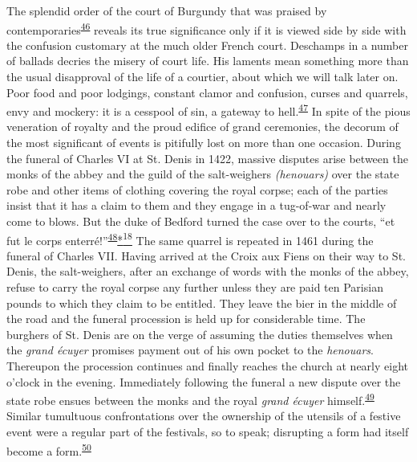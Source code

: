 The splendid order of the court of Burgundy that was praised
\protect\hypertarget{09_Chapter_Two__THE_CRAVING_FOR_A_M.xhtmlux5cux23page_51}{}{}by
contemporaries\textsuperscript{\protect\hypertarget{09_Chapter_Two__THE_CRAVING_FOR_A_M.xhtmlux5cux23id_1996}{\protect\hyperlink{23_NOTES.xhtmlux5cux23id_1997}{46}}}
reveals its true significance only if it is viewed side by side with the
confusion customary at the much older French court. Deschamps in a
number of ballads decries the misery of court life. His laments mean
something more than the usual disapproval of the life of a courtier,
about which we will talk later on. Poor food and poor lodgings, constant
clamor and confusion, curses and quarrels, envy and mockery: it is a
cesspool of sin, a gateway to
hell.\textsuperscript{\protect\hypertarget{09_Chapter_Two__THE_CRAVING_FOR_A_M.xhtmlux5cux23id_1994}{\protect\hyperlink{23_NOTES.xhtmlux5cux23id_1995}{47}}}
In spite of the pious veneration of royalty and the proud edifice of
grand ceremonies, the decorum of the most significant of events is
pitifully lost on more than one occasion. During the funeral of Charles
VI at St. Denis in 1422, massive disputes arise between the monks of the
abbey and the guild of the salt-weighers \emph{(henouars)} over the
state robe and other items of clothing covering the royal corpse; each
of the parties insist that it has a claim to them and they engage in a
tug-of-war and nearly come to blows. But the duke of Bedford turned the
case over to the courts, ``et fut le corps
enterré!''\textsuperscript{\protect\hypertarget{09_Chapter_Two__THE_CRAVING_FOR_A_M.xhtmlux5cux23id_1992}{\protect\hyperlink{23_NOTES.xhtmlux5cux23id_1993}{48}}}\protect\hypertarget{09_Chapter_Two__THE_CRAVING_FOR_A_M.xhtmlux5cux23id_2443}{\protect\hyperlink{23_NOTES.xhtmlux5cux23id_2444}{*\textsuperscript{18}}}
The same quarrel is repeated in 1461 during the funeral of Charles VII.
Having arrived at the Croix aux Fiens on their way to St. Denis, the
salt-weighers, after an exchange of words with the monks of the abbey,
refuse to carry the royal corpse any further unless they are paid ten
Parisian pounds to which they claim to be entitled. They leave the bier
in the middle of the road and the funeral procession is held up for
considerable time. The burghers of St. Denis are on the verge of
assuming the duties themselves when the \emph{grand écuyer} promises
payment out of his own pocket to the \emph{henouars}. Thereupon the
procession continues and finally reaches the church at nearly eight
o'clock in the evening. Immediately following the funeral a new dispute
over the state robe ensues between the monks and the royal \emph{grand
écuyer}
himself.\textsuperscript{\protect\hypertarget{09_Chapter_Two__THE_CRAVING_FOR_A_M.xhtmlux5cux23id_1990}{\protect\hyperlink{23_NOTES.xhtmlux5cux23id_1991}{49}}}
Similar tumultuous confrontations over the ownership of the utensils of
a festive event were a regular part of the festivals, so to speak;
disrupting a form had itself become a
form.\textsuperscript{\protect\hypertarget{09_Chapter_Two__THE_CRAVING_FOR_A_M.xhtmlux5cux23id_1988}{\protect\hyperlink{23_NOTES.xhtmlux5cux23id_1989}{50}}}

